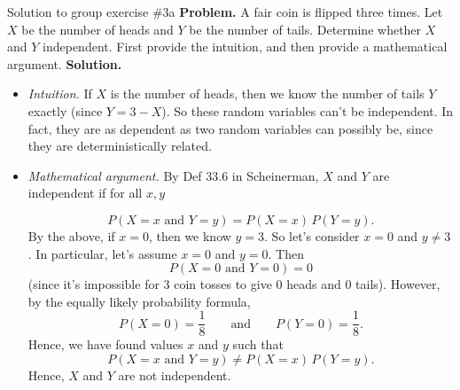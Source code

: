 \documentclass[10pt]{beamer}
\begin{document}
\begin{frame}{Solution to group exercise \#3a}
\footnotesize 
\textbf{Problem.}  A fair coin is flipped three times. Let $X$ be the number of heads and $Y$ be the number of tails. Determine whether $X$ and $Y$ independent. First provide the intuition, and then provide a mathematical argument.  
\vfill 
\vspace{-.2cm}
\textbf{Solution.}
\vspace{-.2cm}
\begin{itemize}
\item \textit{Intuition.} If $X$ is the number of heads, then we \alert{know} the number of tails $Y$ \alert{exactly} (since $Y=3-X$).  So these random variables can't be independent. In fact, they are as dependent as two random variables can possibly be, since they are deterministically related.
\vfill 
\item \textit{Mathematical argument.} By Def 33.6 in Scheinerman, $X$ and $Y$ are independent if for all $x,y$

\[P(X=x \text{ and } Y=y) = P(X=x) \, P(Y=y). \]
By the above, if $x=0$, then we know $y=3$.  So let's consider $x=0$ and $y \neq 3$. In particular, let's assume $x=0$ and $y=0$.  Then 
\[ P(X=0 \text{ and } Y=0) = 0 \]
(since it's impossible for 3 coin tosses to give 0 heads and 0 tails).  However, by the equally likely probability formula,
\[P(X=0) = \frac{1}{8} \qquad \text{and} \qquad  P(Y=0) = \frac{1}{8}.\]
Hence, we have found values $x$ and $y$ such that
\[P(X=x \text{ and } Y=y) \neq P(X=x) \, P(Y=y). \]
Hence, $X$ and $Y$ are not independent.

\end{itemize}

\end{frame}
\end{document}
